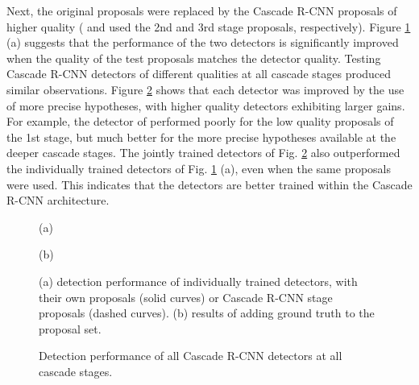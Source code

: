 \documentclass[10pt,journal,compsoc]{IEEEtran}
\begin{document}
Next, the original proposals were replaced by the
Cascade R-CNN proposals of higher quality ( and  used the 2nd
and 3rd stage proposals, respectively). Figure
\ref{fig:hypotheses mismatch} (a) suggests that the performance of the two
detectors is significantly improved when the quality of the test proposals
matches the detector quality.
Testing Cascade R-CNN detectors of different qualities at all cascade stages
produced similar observations. Figure \ref{fig:cascade stage} shows that
each detector was improved by the use of more precise hypotheses, with
higher quality detectors exhibiting larger gains. For example, the detector
of  performed poorly for the low quality proposals of the 1st stage,
but much better for the more precise hypotheses available at the deeper
cascade stages. The jointly trained detectors of
Fig. \ref{fig:cascade stage} also outperformed the individually
trained detectors of Fig. \ref{fig:hypotheses mismatch} (a), even
when the same proposals were used. This indicates that the detectors are
better trained within the Cascade R-CNN architecture.


\begin{figure}[!t]
\begin{minipage}[b]{.48\linewidth}
\centering
\centerline{}{(a)}
\end{minipage}
\hfill
\begin{minipage}[b]{.48\linewidth}
\centering
\centerline{}{(b)}
\end{minipage}
\caption{(a) detection performance of individually trained detectors, with
their own proposals (solid curves) or Cascade R-CNN stage proposals
(dashed curves). (b) results of adding ground truth to the proposal set.}
\label{fig:hypotheses mismatch}\vspace{-2mm}
\end{figure}

\begin{figure}[!t]
\begin{minipage}[b]{.3\linewidth}
\centering
\centerline{}
\end{minipage}
\hfill
\begin{minipage}[b]{.3\linewidth}
\centering
\centerline{}
\end{minipage}
\hfill
\begin{minipage}[b]{.3\linewidth}
\centering
\centerline{}
\end{minipage}
\caption{Detection performance of all Cascade R-CNN detectors at all cascade
stages.}
\label{fig:cascade stage}\vspace{-3mm}
\end{figure}
\end{document}
